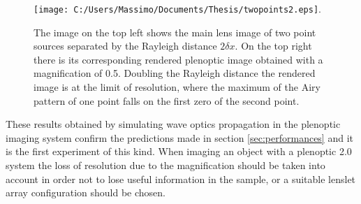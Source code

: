 \begin{figure}[H]
	\centering
	\texttt{[image: C:/Users/Massimo/Documents/Thesis/twopoints2.eps]}.
	\caption{\label{fig:twopoint2} The image on the top left shows  the main lens image of two point sources separated by the Rayleigh distance $2\delta x$. On the top right there is its corresponding rendered plenoptic image obtained with a magnification of 0.5. Doubling the Rayleigh distance the rendered image is at the limit of resolution, where the maximum of the Airy pattern of one point falls on the first zero of the second point. }
\end{figure}
These results obtained by simulating wave optics propagation in the plenoptic imaging system confirm the predictions made in section \ref{sec:performances} and it is the first experiment of this kind. When imaging an object with a plenoptic 2.0 system the loss of resolution due to the magnification should be taken into account in order not to lose useful information in the sample, or a suitable lenslet array configuration should be chosen.
